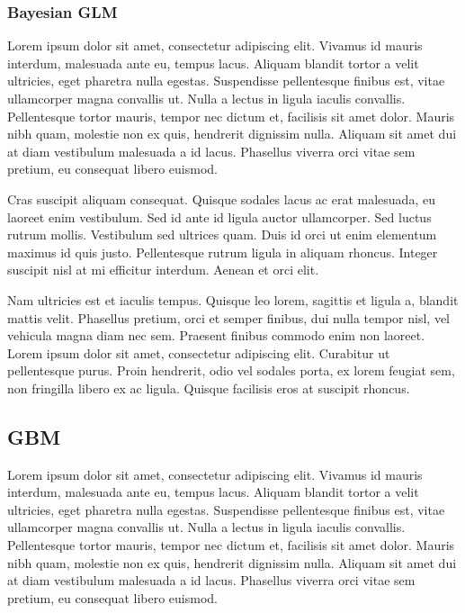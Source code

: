 \documentclass[a4paper, nobind]{templates/ociamthesis}
\theoremstyle{definition}
\theoremstyle{definition}
\theoremstyle{definition}
\theoremstyle{remark}
\begin{document}
\hypertarget{bayesian-glm}{%
\subsubsection{Bayesian GLM}\label{bayesian-glm}}

Lorem ipsum dolor sit amet, consectetur adipiscing elit. Vivamus id mauris interdum, malesuada ante eu, tempus lacus. Aliquam blandit tortor a velit ultricies, eget pharetra nulla egestas. Suspendisse pellentesque finibus est, vitae ullamcorper magna convallis ut. Nulla a lectus in ligula iaculis convallis. Pellentesque tortor mauris, tempor nec dictum et, facilisis sit amet dolor. Mauris nibh quam, molestie non ex quis, hendrerit dignissim nulla. Aliquam sit amet dui at diam vestibulum malesuada a id lacus. Phasellus viverra orci vitae sem pretium, eu consequat libero euismod.

Cras suscipit aliquam consequat. Quisque sodales lacus ac erat malesuada, eu laoreet enim vestibulum. Sed id ante id ligula auctor ullamcorper. Sed luctus rutrum mollis. Vestibulum sed ultrices quam. Duis id orci ut enim elementum maximus id quis justo. Pellentesque rutrum ligula in aliquam rhoncus. Integer suscipit nisl at mi efficitur interdum. Aenean et orci elit.

Nam ultricies est et iaculis tempus. Quisque leo lorem, sagittis et ligula a, blandit mattis velit. Phasellus pretium, orci et semper finibus, dui nulla tempor nisl, vel vehicula magna diam nec sem. Praesent finibus commodo enim non laoreet. Lorem ipsum dolor sit amet, consectetur adipiscing elit. Curabitur ut pellentesque purus. Proin hendrerit, odio vel sodales porta, ex lorem feugiat sem, non fringilla libero ex ac ligula. Quisque facilisis eros at suscipit rhoncus.

\newpage

\hypertarget{gbm}{%
\subsection{GBM}\label{gbm}}

Lorem ipsum dolor sit amet, consectetur adipiscing elit. Vivamus id mauris interdum, malesuada ante eu, tempus lacus. Aliquam blandit tortor a velit ultricies, eget pharetra nulla egestas. Suspendisse pellentesque finibus est, vitae ullamcorper magna convallis ut. Nulla a lectus in ligula iaculis convallis. Pellentesque tortor mauris, tempor nec dictum et, facilisis sit amet dolor. Mauris nibh quam, molestie non ex quis, hendrerit dignissim nulla. Aliquam sit amet dui at diam vestibulum malesuada a id lacus. Phasellus viverra orci vitae sem pretium, eu consequat libero euismod.
\end{document}
